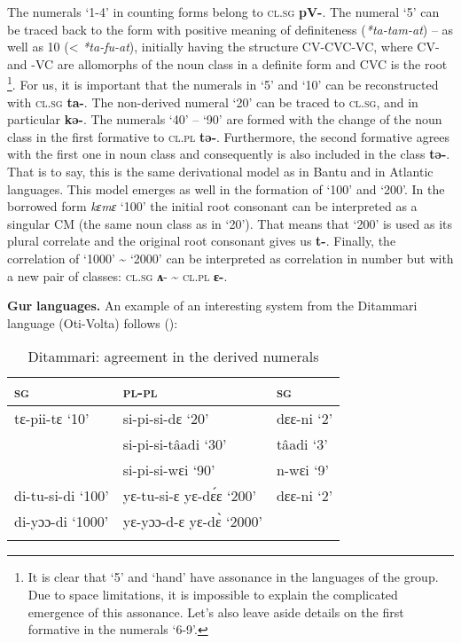 The numerals ‘1-4’ in counting forms belong to \textsc{cl}.\textsc{sg} \textbf{pV-}. The numeral ‘5’ can be traced back to the form with positive meaning of definiteness (\textit{*ta-tam-at}) – as well as 10 (< \textit{*ta-fu-at}), initially having the structure CV-CVC-VC, where CV-  and  -VC  are allomorphs of the noun class in a definite form and CVC is the root \citep[143-144]{Pozdniakov1993}\footnote{It is clear that `5' and `hand' have assonance in the languages of the group. Due to space limitations, it is impossible to explain the complicated emergence of this assonance. Let's also leave aside details on the first formative in the numerals ‘6-9’.}. For us, it is important that the numerals in ‘5’ and ‘10’ can be reconstructed with \textsc{cl}.\textsc{sg} \textbf{ta-}. The non-derived numeral `20' can be traced to \textsc{cl}.\textsc{sg}, and  in particular \textbf{kə-}. The numerals ‘40’ – ‘90’ are formed with the change of the noun class in the first formative to \textsc{cl}.\textsc{pl} \textbf{tə-}. Furthermore, the second formative agrees with the first one in noun class and consequently is also included in the class \textbf{tə-}. That is to say, this is the same derivational model as in Bantu and in Atlantic languages. This model emerges as well in the formation of ‘100’ and ‘200’. In the borrowed form \textit{kɛmɛ} ‘100’ the initial root consonant can be interpreted as a singular CM (the same noun class as in ‘20’). That means that ‘200’ is used as its plural correlate and the original root consonant gives us \textbf{t-}. Finally, the correlation of ‘1000’ {\textasciitilde} ‘2000’ can be interpreted as correlation in number but with a new pair of classes: \textsc{cl}.\textsc{sg} \textbf{ʌ}- {\textasciitilde} \textsc{cl}.\textsc{pl} \textbf{ɛ-}.

\textbf{Gur} \textbf{languages.}  An example of an interesting system from the Ditammari language (Oti-Volta) follows ():


\begin{table}
\caption{\label{tab:1:16} Ditammari: agreement in the derived numerals}

\begin{tabularx}{\textwidth}{lXX}
\lsptoprule

\textsc{sg} & \textsc{pl}-\textsc{pl} & \textsc{sg}\\
\midrule
tɛ-pii-tɛ ‘10’ & si-pi-si-dɛ ‘20’ & dɛɛ-ni ‘2’\\
& si-pi-si-t{\^{a}}adi ‘30’ & t{\^{a}}adi ‘3’\\
& si-pi-si-wɛi ‘90’ & n-wɛi ‘9’\\
di-tu-si-di ‘100’ & yɛ-tu-si-ɛ  yɛ-d{\'{ɛ}}ɛ ‘200’ & dɛɛ-ni ‘2’\\
di-yɔɔ-di ‘1000’ & yɛ-yɔɔ-d-ɛ yɛ-d{\`{ɛ}} ‘2000’ & \\
\lspbottomrule
\end{tabularx}
\end{table}


